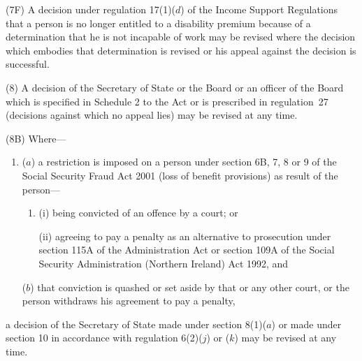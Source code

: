 \documentclass[12pt,a4paper]{article}
\begin{document}
(7F) A decision under regulation 17(1)($d$)  of the Income Support Regulations that a person is no longer entitled to a disability premium because of a determination that he is not incapable of work may be revised where the decision which embodies that determination is revised or his appeal against the decision is successful.

(8) A decision of the Secretary of State 
or the Board or an officer of the Board  %
which is specified in Schedule 2 to the Act or is prescribed in regulation~27 (decisions against which no appeal lies) may be revised at any time.



(8B) Where—
\begin{enumerate}\item[]
($a$) a restriction is imposed on a person under section 6B, 7, 8 or 9 of the Social Security Fraud Act 2001 (loss of benefit provisions) as result of the person—
\begin{enumerate}\item[]
(i) being convicted of an offence by a court; or

(ii) agreeing to pay a penalty as an alternative to prosecution under section 115A of the Administration Act or section 109A of the Social Security Administration (Northern Ireland) Act 1992, and
\end{enumerate}

($b$) that conviction is quashed or set aside by that or any other court, or the person withdraws his agreement to pay a penalty,
\end{enumerate}
a decision of the Secretary of State made under section 8(1)($a$) or made under section 10 in accordance with regulation 6(2)($j$) or ($k$) may be revised at any time.
\end{document}
